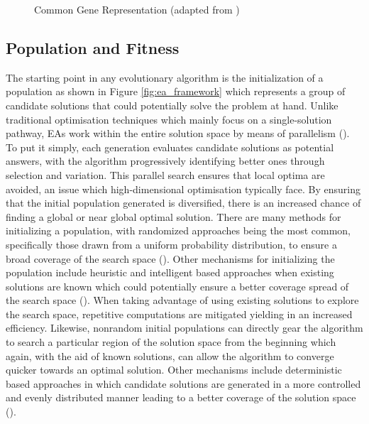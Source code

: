 \begin{figure}[H] %
	\centering %
	\caption{Common Gene Representation (adapted from \cite{intelligentOptimization})}
	\label{fig:ea_representations} %
\end{figure}

\subsection{Population and Fitness}
The starting point in any evolutionary algorithm is the initialization of a population as shown in Figure \ref{fig:ea_framework} which represents a group of candidate solutions that could potentially solve the problem at hand. Unlike traditional optimisation techniques which mainly focus on a single-solution pathway, EAs work within the entire solution space by means of parallelism (\cite{okramergeneticalgorithms}). To put it simply, each generation evaluates candidate solutions as potential answers, with the algorithm progressively identifying better ones through selection and variation. This parallel search ensures that local optima are avoided, an issue which high-dimensional optimisation typically face. By ensuring that the initial population generated is diversified, there is an increased chance of finding a global or near global optimal solution. There are many methods for initializing a population, with randomized approaches being the most common, specifically those drawn from a uniform probability distribution, to ensure a broad coverage of the search space (\cite{initialPopulation}). Other mechanisms for initializing the population include heuristic and intelligent based approaches when existing solutions are known which could potentially ensure a better coverage spread of the search space (\cite{initialPopulation}). When taking advantage of using existing solutions to explore the search space, repetitive computations are mitigated yielding in an increased efficiency. Likewise, nonrandom initial populations can directly gear the algorithm to search a particular region of the solution space from the beginning which again, with the aid of known solutions, can allow the algorithm to converge quicker towards an optimal solution. Other mechanisms include deterministic based approaches in which candidate solutions are generated in a more controlled and evenly distributed manner leading to a better coverage of the solution space (\cite{THARWAT2021100952}). \bigskip

